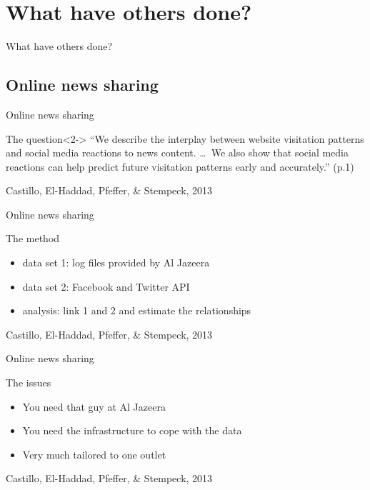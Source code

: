 \section{What have others done?}
\begin{frame}
What have others done?
\end{frame}

\subsection{Online news sharing}
\begin{frame}{Online news sharing}
\begin{block}{The question}<2->
``We describe the interplay between website visitation patterns and social media reactions to news content. \lbrack\ldots\rbrack ~We also show  that social media reactions can help predict future visitation patterns early and accurately.'' (p.1)
\end{block}
\footnotesize{Castillo, El-Haddad, Pfeffer, \& Stempeck, 2013}
\end{frame}

\begin{frame}{Online news sharing}
\begin{block}{The method}
\begin{itemize}
\item data set 1: log files provided by Al Jazeera
\item data set 2: Facebook and Twitter API
\item analysis: link 1 and 2 and estimate the relationships  
\end{itemize}
\end{block}
\footnotesize{Castillo, El-Haddad, Pfeffer, \& Stempeck, 2013}
\end{frame}


{
\begin{frame}[plain]
\end{frame}
}



\begin{frame}{Online news sharing}
\begin{block}{The issues}
\begin{itemize}
\item You need that guy at Al Jazeera
\item You need the infrastructure to cope with the data
\item Very much tailored to one outlet
\end{itemize}
\end{block}
\footnotesize{Castillo, El-Haddad, Pfeffer, \& Stempeck, 2013}
\end{frame}

